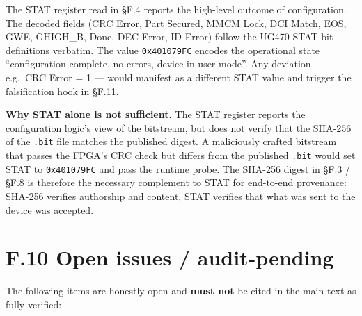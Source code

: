 The STAT register read in \S F.4 reports the high-level outcome of
configuration. The decoded fields (CRC Error, Part Secured, MMCM Lock,
DCI Match, EOS, GWE, GHIGH\_B, Done, DEC Error, ID Error) follow the
UG470 STAT bit definitions verbatim. The value \texttt{0x401079FC}
encodes the operational state ``configuration complete, no errors,
device in user mode''. Any deviation --- e.g.\ CRC Error = 1 ---
would manifest as a different STAT value and trigger the falsification
hook in \S F.11.

\textbf{Why STAT alone is not sufficient.} The STAT register reports
the configuration logic's view of the bitstream, but does not verify
that the SHA-256 of the \texttt{.bit} file matches the published
digest. A maliciously crafted bitstream that passes the FPGA's CRC
check but differs from the published \texttt{.bit} would set STAT to
\texttt{0x401079FC} and pass the runtime probe. The SHA-256 digest in
\S F.3 / \S F.8 is therefore the necessary complement to STAT for
end-to-end provenance: SHA-256 verifies authorship and content, STAT
verifies that what was sent to the device was accepted.

\section*{F.10 Open issues / audit-pending}
\label{sec:appF-open}

The following items are honestly open and \textbf{must not} be cited
in the main text as fully verified:

